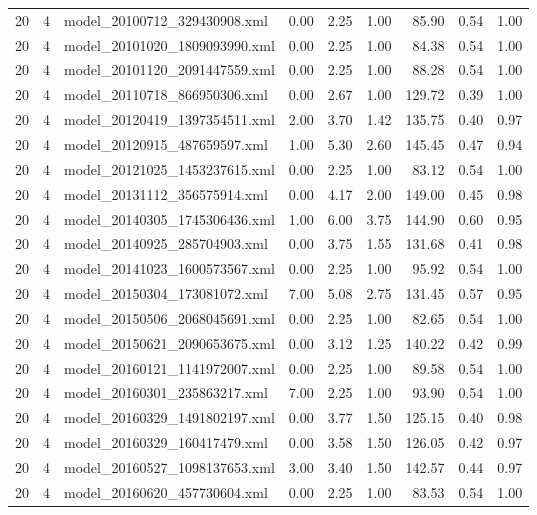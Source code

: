 \begin{table}[ht]
\begin{tabular}{rrlrrrrrr}
   20 &   4 & model\_20100712\_329430908.xml & 0.00 & 2.25 & 1.00 & 85.90 & 0.54 & 1.00 \\ 
   20 &   4 & model\_20101020\_1809093990.xml & 0.00 & 2.25 & 1.00 & 84.38 & 0.54 & 1.00 \\ 
   20 &   4 & model\_20101120\_2091447559.xml & 0.00 & 2.25 & 1.00 & 88.28 & 0.54 & 1.00 \\ 
   20 &   4 & model\_20110718\_866950306.xml & 0.00 & 2.67 & 1.00 & 129.72 & 0.39 & 1.00 \\ 
   20 &   4 & model\_20120419\_1397354511.xml & 2.00 & 3.70 & 1.42 & 135.75 & 0.40 & 0.97 \\ 
   20 &   4 & model\_20120915\_487659597.xml & 1.00 & 5.30 & 2.60 & 145.45 & 0.47 & 0.94 \\ 
   20 &   4 & model\_20121025\_1453237615.xml & 0.00 & 2.25 & 1.00 & 83.12 & 0.54 & 1.00 \\ 
   20 &   4 & model\_20131112\_356575914.xml & 0.00 & 4.17 & 2.00 & 149.00 & 0.45 & 0.98 \\ 
   20 &   4 & model\_20140305\_1745306436.xml & 1.00 & 6.00 & 3.75 & 144.90 & 0.60 & 0.95 \\ 
   20 &   4 & model\_20140925\_285704903.xml & 0.00 & 3.75 & 1.55 & 131.68 & 0.41 & 0.98 \\ 
   20 &   4 & model\_20141023\_1600573567.xml & 0.00 & 2.25 & 1.00 & 95.92 & 0.54 & 1.00 \\ 
   20 &   4 & model\_20150304\_173081072.xml & 7.00 & 5.08 & 2.75 & 131.45 & 0.57 & 0.95 \\ 
   20 &   4 & model\_20150506\_2068045691.xml & 0.00 & 2.25 & 1.00 & 82.65 & 0.54 & 1.00 \\ 
   20 &   4 & model\_20150621\_2090653675.xml & 0.00 & 3.12 & 1.25 & 140.22 & 0.42 & 0.99 \\ 
   20 &   4 & model\_20160121\_1141972007.xml & 0.00 & 2.25 & 1.00 & 89.58 & 0.54 & 1.00 \\ 
   20 &   4 & model\_20160301\_235863217.xml & 7.00 & 2.25 & 1.00 & 93.90 & 0.54 & 1.00 \\ 
   20 &   4 & model\_20160329\_1491802197.xml & 0.00 & 3.77 & 1.50 & 125.15 & 0.40 & 0.98 \\ 
   20 &   4 & model\_20160329\_160417479.xml & 0.00 & 3.58 & 1.50 & 126.05 & 0.42 & 0.97 \\ 
   20 &   4 & model\_20160527\_1098137653.xml & 3.00 & 3.40 & 1.50 & 142.57 & 0.44 & 0.97 \\ 
   20 &   4 & model\_20160620\_457730604.xml & 0.00 & 2.25 & 1.00 & 83.53 & 0.54 & 1.00 \\ 

\end{tabular}
\end{table}
